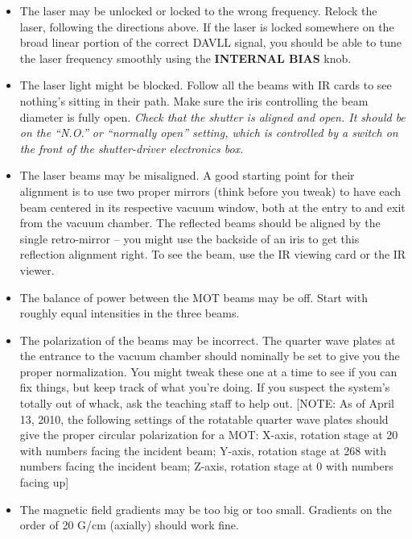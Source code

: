 \documentclass{../lab}
\begin{document}
\begin{itemize}
    \item The laser may be unlocked or locked to the wrong frequency. Relock the laser, following the directions above. If the laser is locked somewhere on the broad linear portion of the correct DAVLL signal, you should be able to tune the laser frequency smoothly using the \textbf{INTERNAL BIAS} knob.

    \item The laser light might be blocked. Follow all the beams with IR cards to see nothing's sitting in their path. Make sure the iris controlling the beam diameter is fully open. \emph{Check that the shutter is aligned and open. It should be on the ``N.O.'' or ``normally open'' setting, which is controlled by a switch on the front of the shutter-driver electronics box. }

    \item The laser beams may be misaligned. A good starting point for their alignment is to use two proper mirrors (think before you tweak) to have each beam centered in its respective vacuum window, both at the entry to and exit from the vacuum chamber. The reflected beams should be aligned by the single retro-mirror -- you might use the backside of an iris to get this reflection alignment right. To see the beam, use the IR viewing card or the IR viewer.

    \item The balance of power between the MOT beams may be off. Start with roughly equal intensities in the three beams.

\newpage

    \item The polarization of the beams may be incorrect. The quarter wave plates at the entrance to the vacuum chamber should nominally be set to give you the proper normalization. You might tweak these one at a time to see if you can fix things, but keep track of what you're doing. If you suspect the system's totally out of whack, ask the teaching staff to help out. [NOTE: As of April 13, 2010, the following settings of the rotatable quarter wave plates should give the proper circular polarization for a MOT: X-axis, rotation stage at 20 with numbers facing the incident beam; Y-axis, rotation stage at 268 with numbers facing the incident beam; Z-axis, rotation stage at 0 with numbers facing up]

    \item The magnetic field gradients may be too big or too small. Gradients on the order of 20 G/cm (axially) should work fine.


\end{itemize}
\end{document}
